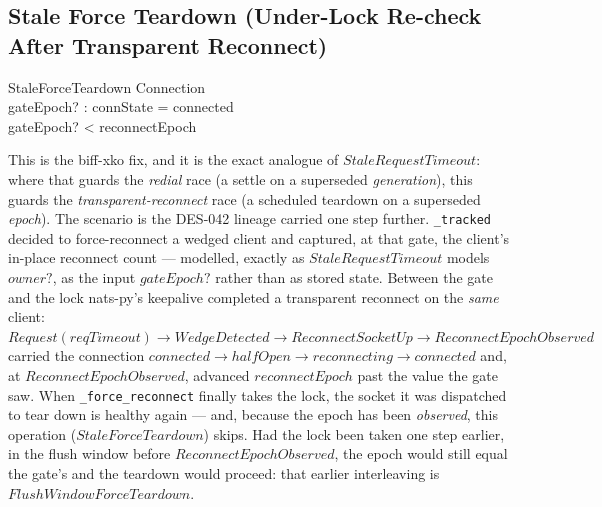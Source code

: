 \documentclass[a4paper,10pt,fleqn]{article}
\begin{document}
\subsection{Stale Force Teardown (Under-Lock Re-check After Transparent
Reconnect)}

\begin{schema}{StaleForceTeardown}
  \Xi Connection \\
  gateEpoch? : \nat
  \where
  connState = connected \\
  gateEpoch? < reconnectEpoch
\end{schema}

This is the biff-xko fix, and it is the exact analogue of
$StaleRequestTimeout$: where that guards the \emph{redial} race (a
settle on a superseded \emph{generation}), this guards the
\emph{transparent-reconnect} race (a scheduled teardown on a superseded
\emph{epoch}).  The scenario is the DES-042 lineage carried one step
further.  \texttt{\_tracked} decided to force-reconnect a wedged client
and captured, at that gate, the client's in-place reconnect count ---
modelled, exactly as $StaleRequestTimeout$ models $owner?$, as the input
$gateEpoch?$ rather than as stored state.  Between the gate and the lock
nats-py's keepalive completed a transparent reconnect on the \emph{same}
client: $Request(reqTimeout) \to WedgeDetected \to ReconnectSocketUp \to
ReconnectEpochObserved$ carried the connection $connected \to halfOpen
\to reconnecting \to connected$ and, at $ReconnectEpochObserved$, advanced
$reconnectEpoch$ past the value the gate saw.  When
\texttt{\_force\_reconnect} finally takes the lock, the socket it was
dispatched to tear down is healthy again --- and, because the epoch has
been \emph{observed}, this operation ($StaleForceTeardown$) skips.  Had
the lock been taken one step earlier, in the flush window before
$ReconnectEpochObserved$, the epoch would still equal the gate's and the
teardown would proceed: that earlier interleaving is
$FlushWindowForceTeardown$.
\end{document}
